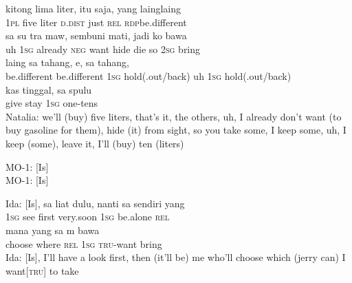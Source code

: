 \ea
{}    {kitong}    {lima}    {liter,}    {itu}    {saja,}    {yang}    {laing{\Tilde}laing}\\
   {}    {\textsc{1pl}}    {five}    {liter}    {\textsc{d.dist}}    {just}    {\textsc{rel}}    {\textsc{rdp}{\Tilde}be.different}\\
    {sa}    {su}    {tra}    {maw,}    {sembuni}    {mati,}    {jadi}   ko   bawa\\
   {uh}    {\textsc{1sg}}    {already}    {\textsc{neg}}    {want}    {hide}    {die}    {so}   \textsc{2sg}   bring\\
    {laing}    {sa}    {tahang,}   e,    {sa}    {tahang,}\\
   {be.different}    {be.different}    {\textsc{1sg}}    {hold(.out/back)}   uh    {\textsc{1sg}}    {hold(.out/back)}\\
\gll kas    {tinggal,}    {sa}    {spulu}\\
  give    {stay}    {\textsc{1sg}}    {one-tens}\\
\glt
Natalia: we’ll (buy) five liters, that’s it, the others, uh, I already don’t want (to buy gasoline for them), hide (it) from sight, so you take some, I keep some, uh, I keep (some), leave it, I’ll (buy) ten (liters)
\z

\ea
\gll   MO-1:   [Is]\\
MO-1: [Is]\\
\z

\ea
\gll   Ida:    {[Is],}    {sa}   liat    {dulu,}    {nanti}   sa   sendiri   yang\\
{}      {}    {\textsc{1sg}}   see    {first}    {very.soon}   \textsc{1sg}   be.alone   \textsc{rel}\\
    {mana}    {yang}   sa    {m}    {bawa}\\
   {choose}    {where}    {\textsc{rel}}   \textsc{1sg}    {\textsc{tru}{}-want}    {bring}\\
\glt
Ida: [Is], I’ll have a look first, then (it’ll be) me who’ll choose which (jerry can) I want[\textsc{tru}] to take
\z

